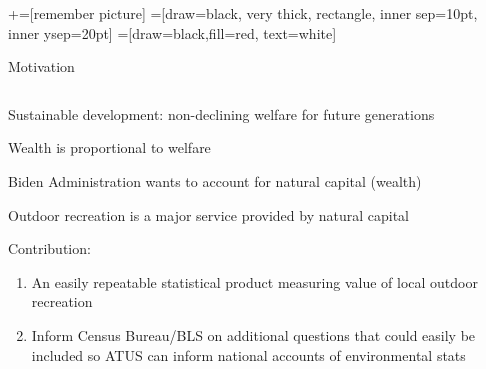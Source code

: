 \documentclass[notes,11pt, aspectratio=169]{beamer}
\title[]{\textcolor{black}{\textbf{National Aggregate Value of Local Outdoor Recreation}}
\subtitle{Achieving repeatable statistical products using ATUS}}
\author[]{Andie Creel}
\institute[]{\small{Camp Resources}}
\date{August 7, 2023}
\newenvironment{wideitemize}{\itemize\addtolength{\itemsep}{10pt}}{\enditemize}
\begin{document}
\newcommand\marktopleft[1]{%
    \tikz[overlay,remember picture] 
        \node (marker-#1-a) at (-.3em,.3em) {};%
}
\newcommand\markbottomright[2]{%
    \tikz[overlay,remember picture] 
        \node (marker-#1-b) at (0em,0em) {};%
}
+=[remember picture] 
 =[draw=black, very thick, rectangle, inner sep=10pt, inner ysep=20pt]
 =[draw=black,fill=red, text=white]

\begin{frame}
\maketitle
\end{frame}


\begin{frame}{Motivation}

\begin{columns}[T] %
\begin{column}{.9\textwidth}
  \begin{wideitemize}
  \item Sustainable development: non-declining welfare for future generations 
  \item Wealth is proportional to welfare \citep{arrow_evaluating_2003}
  \item Biden Administration wants to account for natural capital (wealth)
  \item  Outdoor recreation is a major service provided by natural capital 
  \item Contribution: 
    \begin{enumerate}
        \item An easily repeatable statistical product measuring value of local outdoor recreation
        \item Inform Census Bureau/BLS on additional questions that could easily be included so ATUS can inform national accounts of environmental stats 
    \end{enumerate}

  \end{wideitemize}
\end{column}%
\hfill%
\begin{column}{.38\textwidth}
  \makebox[\linewidth][c]{
    \resizebox{\linewidth}{!}{
    }
  }
\end{column}%
\end{columns}
\end{frame}
\end{document}
